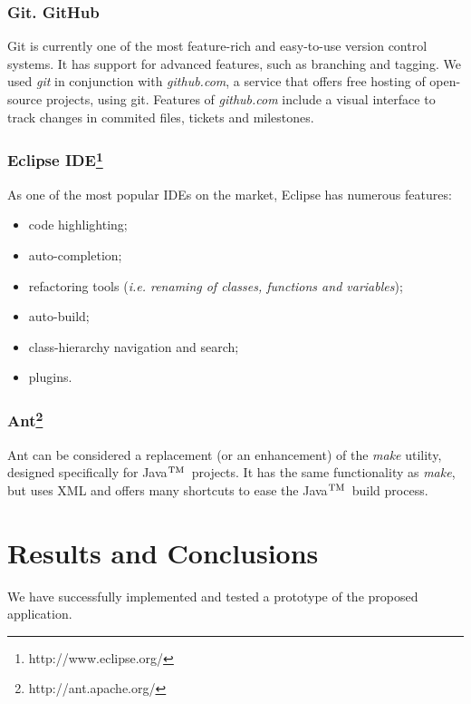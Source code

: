 \documentclass[a4paper,onecolumn,oneside,titlepage,11pt]{report}
\def\tm{\leavevmode\hbox{$\rm {}^{TM}$}}
\begin{document}
\subsection*{Git. GitHub}
Git is currently one of the most feature-rich and easy-to-use version control systems. It has support for advanced features, such as branching and tagging. We used \emph{git} in conjunction with \emph{github.com}, a service that offers free hosting of open-source projects, using git. Features of \emph{github.com} include a visual interface to track changes in commited files, tickets and milestones.

\subsection*{Eclipse IDE\footnote{http://www.eclipse.org/}}
As one of the most popular IDEs on the market, Eclipse has numerous features:
\begin{itemize}
	\item code highlighting;
	\item auto-completion;
	\item refactoring tools (\emph{i.e. renaming of classes, functions and variables});
	\item auto-build;
	\item class-hierarchy navigation and search;
	\item plugins.
\end{itemize}

\subsection*{Ant\footnote{http://ant.apache.org/}}
Ant can be considered a replacement (or an enhancement) of the \emph{make} utility, designed specifically for Java\tm\ projects. It has the same functionality as \emph{make}, but uses XML and offers many shortcuts to ease the Java\tm\ build process.

\chapter{Results and Conclusions}
\label{chap:results}

We have successfully implemented and tested a prototype of the proposed application. 
\end{document}
